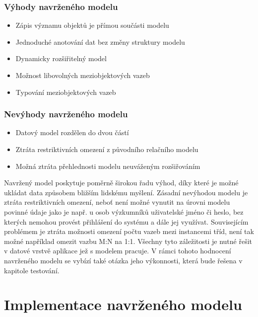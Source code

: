 \documentclass{projekt}
\begin{document}
\subsection{Výhody navrženého modelu}

\begin{itemize}
\item Zápis významu objektů je přímou součásti modelu
\item Jednoduché anotování dat bez změny struktury modelu
\item Dynamicky rozšiřitelný model
\item Možnost libovolných meziobjektových  vazeb
\item Typování meziobjektových vazeb
\end{itemize}


\subsection{Nevýhody navrženého modelu}

\begin{itemize}
\item Datový model rozdělen do dvou částí
\item Ztráta restriktivních omezení z původního relačního modelu
\item Možná ztráta přehlednosti modelu neuváženým rozšiřováním
\end{itemize}

Navržený model poskytuje poměrně širokou řadu výhod, díky které je možné ukládat data způsobem bližším lidskému myšlení. Zásadní nevýhodou modelu je ztráta restriktivních omezení, neboť není možné vynutit na úrovni modelu povinné údaje jako je např. u osob výzkumníků uživatelské jméno či heslo, bez kterých nemohou provést přihlášení do systému a dále jej využívat. Souvisejícím problémem je ztráta možnosti omezení počtu vazeb mezi instancemi tříd, není tak možné například omezit vazbu M:N na 1:1. Všechny tyto záležitosti je nutné řešit v datové vrstvě aplikace jež s modelem pracuje. V rámci tohoto hodnocení navrženého modelu se vybízí také otázka jeho výkonnosti, která bude řešena v kapitole testování.


\chapter{Implementace navrženého modelu}
\end{document}
